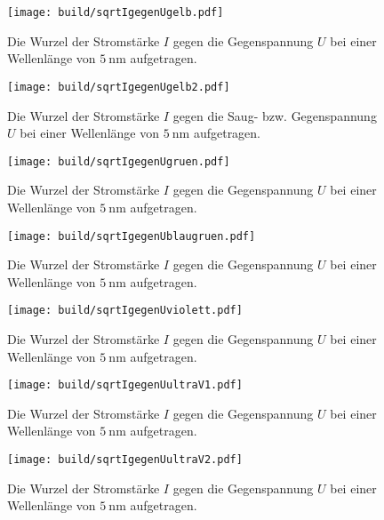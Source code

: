  
\begin{figure}
	\centering
	\caption{Die Wurzel der Stromstärke $I$ gegen die Gegenspannung $U$ bei einer Wellenlänge von  $\SI{5}{\nano\meter}$ aufgetragen.}
	\texttt{[image: build/sqrtIgegenUgelb.pdf]}
	\label{fig:Graphgelb1}
\end{figure}
\begin{figure}
	\centering
	\caption{Die Wurzel der Stromstärke $I$ gegen die Saug- bzw. Gegenspannung $U$ bei einer Wellenlänge von  $\SI{5}{\nano\meter}$ aufgetragen.}
	\texttt{[image: build/sqrtIgegenUgelb2.pdf]}
	\label{fig:Graphgelb2}
\end{figure}
\begin{figure}
	\centering
	\caption{Die Wurzel der Stromstärke $I$ gegen die Gegenspannung $U$ bei einer Wellenlänge von  $\SI{5}{\nano\meter}$ aufgetragen.}
	\texttt{[image: build/sqrtIgegenUgruen.pdf]}
	\label{fig:Graphgruen}
\end{figure}
\begin{figure}
	\centering
	\caption{Die Wurzel der Stromstärke $I$ gegen die Gegenspannung $U$ bei einer Wellenlänge von  $\SI{5}{\nano\meter}$ aufgetragen.}
	\texttt{[image: build/sqrtIgegenUblaugruen.pdf]}
	\label{fig:Graphblaugruen}
\end{figure}
\begin{figure}
	\centering
	\caption{Die Wurzel der Stromstärke $I$ gegen die Gegenspannung $U$ bei einer Wellenlänge von  $\SI{5}{\nano\meter}$ aufgetragen.}
	\texttt{[image: build/sqrtIgegenUviolett.pdf]}
	\label{fig:Graphviolett}
\end{figure}
\begin{figure}
	\centering
	\caption{Die Wurzel der Stromstärke $I$ gegen die Gegenspannung $U$ bei einer Wellenlänge von  $\SI{5}{\nano\meter}$ aufgetragen.}
	\texttt{[image: build/sqrtIgegenUultraV1.pdf]}
	\label{fig:GraphultraV1}
\end{figure}
\begin{figure}
	\centering
	\caption{Die Wurzel der Stromstärke $I$ gegen die Gegenspannung $U$ bei einer Wellenlänge von  $\SI{5}{\nano\meter}$ aufgetragen.}
	\texttt{[image: build/sqrtIgegenUultraV2.pdf]}
	\label{fig:GraphultraV2}
\end{figure}
 

 